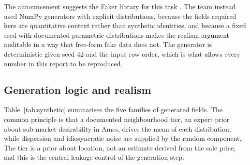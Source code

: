 The announcement suggests the Faker library for this task \citep{faker2026}. The team
instead used NumPy generators with explicit distributions, because the fields
required here are quantitative context rather than synthetic identities, and because
a fixed seed with documented parametric distributions makes the realism argument
auditable in a way that free-form fake data does not. The generator is deterministic
given seed 42 and the input row order, which is what allows every number in this
report to be reproduced.

\subsection{Generation logic and realism}

Table~\ref{tab:synthetic} summarises the five families of generated fields. The
common principle is that a documented neighbourhood tier, an expert prior about
sub-market desirability in Ames, drives the mean of each distribution, while
dispersion and idiosyncratic noise are supplied by the random component. The tier is
a prior about location, not an estimate derived from the sale price, and this is the
central leakage control of the generation step.

